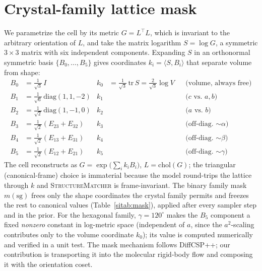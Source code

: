 \documentclass[journal=acsodf,manuscript=article]{achemso}
\begin{document}
\section{Crystal-family lattice mask}\label{sisec:family}
We parametrize the cell by its metric $G=L^\top L$, which is invariant to the
arbitrary orientation of $L$, and take the matrix logarithm $S=\log G$, a symmetric
$3\times3$ matrix with six independent components. Expanding $S$ in an orthonormal
symmetric basis $\{B_0,\dots,B_5\}$ gives coordinates $k_i=\langle S,B_i\rangle$
that separate volume from shape:
\begin{align*}
B_0 &= \tfrac{1}{\sqrt3}\,I               & k_0 &= \tfrac{1}{\sqrt3}\,\mathrm{tr}\,S = \tfrac{2}{\sqrt3}\log V &&\text{(volume, always free)}\\
B_1 &= \tfrac{1}{\sqrt6}\,\mathrm{diag}(1,1,-2) & k_1 &&&\text{($c$ vs.\ $a,b$)}\\
B_2 &= \tfrac{1}{\sqrt2}\,\mathrm{diag}(1,-1,0)  & k_2 &&&\text{($a$ vs.\ $b$)}\\
B_3 &= \tfrac{1}{\sqrt2}(E_{23}+E_{32})   & k_3 &&&\text{(off-diag.\ $\sim\!\alpha$)}\\
B_4 &= \tfrac{1}{\sqrt2}(E_{13}+E_{31})   & k_4 &&&\text{(off-diag.\ $\sim\!\beta$)}\\
B_5 &= \tfrac{1}{\sqrt2}(E_{12}+E_{21})   & k_5 &&&\text{(off-diag.\ $\sim\!\gamma$)}
\end{align*}
The cell reconstructs as $G=\exp\big(\sum_i k_i B_i\big)$, $L=\mathrm{chol}(G)$; the
triangular (canonical-frame) choice is immaterial because the model round-trips the
lattice through $k$ and \textsc{StructureMatcher} is frame-invariant. The binary
family mask $m(\mathrm{sg})$ frees only the shape coordinates the crystal family
permits and freezes the rest to canonical values (Table~\ref{sitab:mask}), applied
after every sampler step and in the prior. For the hexagonal family,
$\gamma=120^\circ$ makes the $B_5$ component a fixed \emph{nonzero} constant in
log-metric space (independent of $a$, since the $a^2$-scaling contributes only to
the volume coordinate $k_0$); its value is computed numerically and verified in a
unit test. The mask mechanism follows DiffCSP++\cite{jiao2024diffcsppp}; our
contribution is transporting it into the molecular rigid-body flow and composing it
with the orientation coset.
\end{document}
